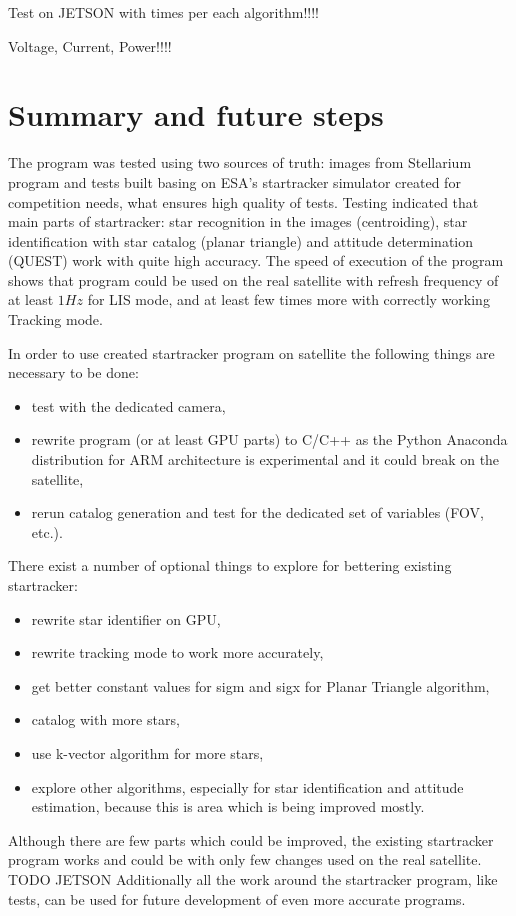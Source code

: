 \documentclass[12pt,a4paper,oneside]{article}
\begin{document}
Test on JETSON with times per each algorithm!!!!


Voltage, Current, Power!!!!


\newpage
\section{Summary and future steps}


The program was tested using two sources of truth: images from Stellarium program and tests built basing on ESA's startracker simulator created for competition needs, what ensures high quality of tests. Testing indicated that main parts of startracker: star recognition in the images (centroiding), star identification with star catalog (planar triangle) and attitude determination (QUEST) work with quite high accuracy. The speed of execution of the program shows that program could be used on the real satellite with refresh frequency of at least $1Hz$ for LIS mode, and at least few times more with correctly working Tracking mode.

In order to use created startracker program on satellite the following things are necessary to be done:
\begin{itemize}
\item test with the dedicated camera,
\item rewrite program (or at least GPU parts) to C/C++ as the Python Anaconda distribution for ARM architecture is experimental and it could break on the satellite,
\item rerun catalog generation and test for the dedicated set of variables (FOV, etc.).
\end{itemize}

There exist a number of optional things to explore for bettering existing startracker:
\begin{itemize}
\item rewrite star identifier on GPU,
\item rewrite tracking mode to work more accurately,
\item get better constant values for sigm and sigx for Planar Triangle algorithm,
\item catalog with more stars,
\item use k-vector algorithm for more stars,
\item explore other algorithms, especially for star identification and attitude estimation, because this is area which is being improved mostly.
\end{itemize}

Although there are few parts which could be improved, the existing startracker program works and could be with only few changes used on the real satellite. 
TODO JETSON
Additionally all the work around the startracker program, like tests, can be used for future development of even more accurate programs.


\newpage






\newpage

\listoftables

\newpage

\listoffigures

\newpage
\end{document}
